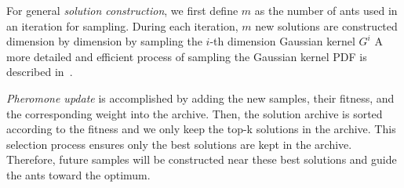 For general \textit{solution construction}, we first define $m$ as the number of ants used in an iteration for sampling.
During each iteration, $m$ new solutions are constructed dimension by dimension by sampling the $i$-th dimension Gaussian kernel $G^i$
A more detailed and efficient process of sampling the Gaussian kernel PDF is described in~\cite{Socha:2008:ACOR}.

\textit{Pheromone update} is accomplished by adding the new samples, their fitness, and the corresponding weight into the archive.
Then, the solution archive is sorted according to the fitness and we only keep the top-k solutions in the archive.
This selection process ensures only the best solutions are kept in the archive.
Therefore, future samples will be constructed near these best solutions and guide the ants toward the optimum.






